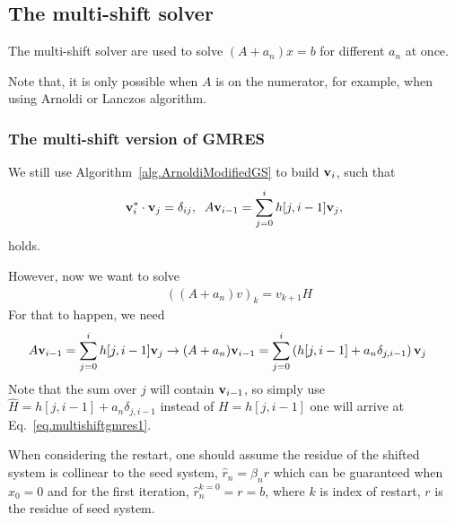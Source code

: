 \subsection{\label{sec:Multishift}The multi-shift solver}

The multi-shift solver are used to solve $(A+a_n)x=b$ for different $a_n$ at once.

Note that, it is only possible when $A$ is on the numerator, for example, when using Arnoldi or Lanczos algorithm.

\subsubsection{\label{sec:MultishiftGMRES}The multi-shift version of GMRES}

We still use Algorithm~\ref{alg.ArnoldiModifiedGS} to build ${\bf v}_i$, such that
\begin{equation}
\begin{split}
&{\bf v}_i^*\cdot {\bf v}_j=\delta _{ij},\;\;A{\bf v}_{i-1}=\sum _{j=0}^i h[j,i-1]{\bf v}_j,\\
\end{split}
\end{equation}
holds.

However, now we want to solve
\begin{equation}
\begin{split}
&((A+a_n)v)_k=v_{k+1}H
\end{split}
\label{eq.multishiftgmres1}
\end{equation}
For that to happen, we need
\begin{equation}
\begin{split}
&A{\bf v}_{i-1} = \sum _{j=0}^i h[j,i-1]{\bf v}_j \to (A+a_n){\bf v}_{i-1} = \sum _{j=0}^i \left( h[j,i-1] + a_n \delta _{j,i-1}\right){\bf v}_j
\end{split}
\end{equation}
Note that the sum over $j$ will contain ${\bf v}_{i-1}$, so simply use $\hat{H}=h[j,i-1]+a_n \delta _{j,i-1}$ instead of $H=h[j,i-1]$ one will arrive at Eq.~\ref{eq.multishiftgmres1}.

When considering the restart, one should assume the residue of the shifted system is collinear to the seed system, $\hat{r}_n = \beta _n r$ which can be guaranteed when $x_0=0$ and for the first iteration, $\hat{r}_n^{k=0}=r=b$, where $k$ is index of restart, $r$ is the residue of seed system.


